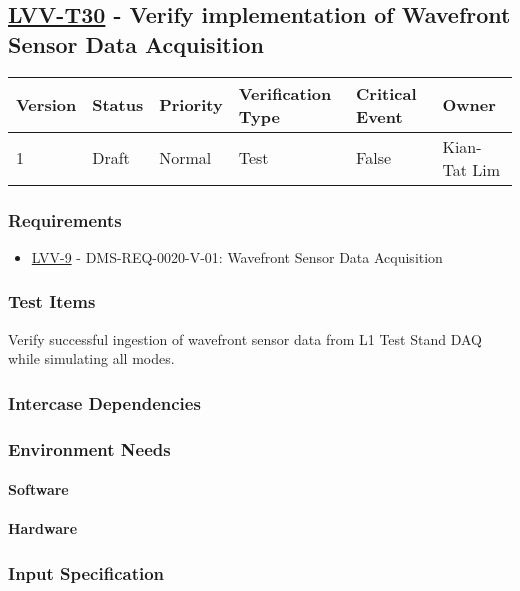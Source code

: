 \subsection{\href{https://jira.lsstcorp.org/secure/Tests.jspa\#/testCase/LVV-T30}{LVV-T30}
    - Verify implementation of Wavefront Sensor Data Acquisition}\label{lvv-t30}

\begin{longtable}[]{llllll}
\toprule
Version & Status & Priority & Verification Type & Critical Event & Owner
\\\midrule
1 & Draft & Normal &
Test & False & Kian-Tat Lim
\\\bottomrule
\end{longtable}

\subsubsection{Requirements}
\begin{itemize}
\item \href{https://jira.lsstcorp.org/browse/LVV-9}{LVV-9} - DMS-REQ-0020-V-01: Wavefront Sensor Data Acquisition
\end{itemize}

\subsubsection{Test Items}
Verify successful ingestion of wavefront sensor data from L1 Test Stand
DAQ while simulating all modes.



\subsubsection{Intercase Dependencies}

\subsubsection{Environment Needs}

\paragraph{Software}

\paragraph{Hardware}

\subsubsection{Input Specification}

